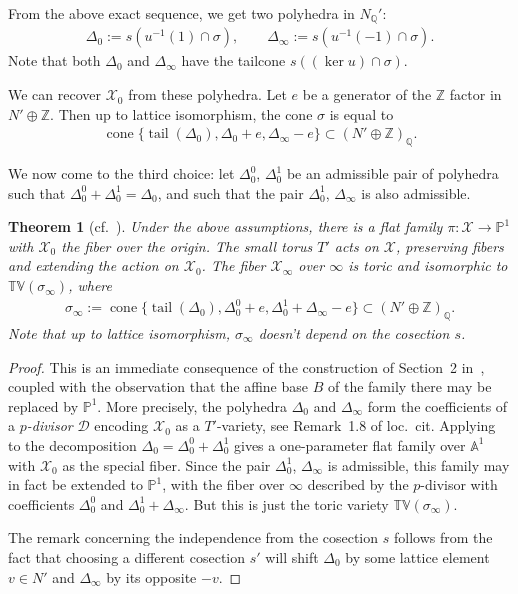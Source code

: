\documentclass[pdftex]{sigma}
\newcommand{\QQ}{\mathbb{Q}}
\newcommand{\ZZ}{\mathbb Z}
\newcommand{\PP}{\mathbb{P}}
\newcommand{\tv}{\mathbb{TV}}
\newcommand{\D}{\mathcal D}
\newcommand{\cX}{\mathcal{X}}
\DeclareMathOperator{\cone}{cone}
\DeclareMathOperator{\tail}{tail}
\newtheorem{Theorem}{Theorem}[section]
 { \theoremstyle{definition}
\newtheorem{Definition}[Theorem]{Definition}
\newtheorem{Example}[Theorem]{Example}
\newtheorem{Remark}[Theorem]{Remark} }
\begin{document}
From the above exact sequence, we get two polyhedra in $N_\QQ'$:
\begin{gather*}
\Delta_0 :=s(u^{-1}(1)\cap\sigma),\qquad
\Delta_\infty :=s(u^{-1}(-1)\cap\sigma).
\end{gather*}
Note that both $\Delta_0$ and $\Delta_\infty$ have the tailcone $s( (\ker u) \cap \sigma)$.

We can recover $\cX_0$ from these polyhedra. Let $e$ be a generator of the $\ZZ$ factor in $N' \oplus \ZZ$. Then up to lattice isomorphism, the cone $\sigma$ is equal to
\begin{gather*}
\cone \{\tail(\Delta_0),\Delta_0+e,\Delta_\infty-e\}\subset(N'\oplus \ZZ)_\QQ.
\end{gather*}

We now come to the third choice: let $\Delta_0^0$, $\Delta_0^1$ be an admissible pair of polyhedra such that $\Delta_0^0+\Delta_0^1=\Delta_0$, and such that the pair $\Delta_0^1$, $\Delta_\infty$ is also admissible.

\begin{Theorem}[{cf.~\cite[Theorem~2.8]{ilten:09b}}]\label{thm:family}
Under the above assumptions, there is a flat family \mbox{$\pi\colon \cX \to\PP^1$} with $\cX_0$ the fiber over the origin. The small torus $T'$ acts on $\cX$, preserving fibers and extending the action on $\cX_0$. The fiber $\cX_\infty$ over $\infty$ is toric and isomorphic to $\tv(\sigma_\infty)$, where
\begin{gather*}
\sigma_\infty:=\cone \big\{\tail(\Delta_0),\Delta_0^0+e,\Delta_0^1+\Delta_\infty-e\big\}\subset(N'\oplus \ZZ)_\QQ.
\end{gather*}
Note that up to lattice isomorphism, $\sigma_\infty$ doesn't depend on the cosection $s$.
\end{Theorem}

\begin{proof}
	This is an immediate consequence of the construction of Section~2 in~\cite{ilten:09b}, coupled with the observation that the af\/f\/ine base $B$ of the family there may be replaced by $\PP^1$.
	More precisely, the polyhedra $\Delta_0$ and $\Delta_\infty$ form the coef\/f\/icients of a \emph{$p$-divisor} $\D$ encoding $\cX_0$ as a $T'$-variety, see Remark~1.8 of loc.~cit.  Applying \cite[Theorem~2.8]{ilten:09b} to the decomposition $\Delta_0=\Delta_0^0+\Delta_0^1$ gives a one-parameter f\/lat family over $\mathbb{A}^1$ with $\cX_0$ as the special f\/iber. Since the pair $\Delta_0^1$, $\Delta_\infty$ is admissible, this family may in fact be extended to $\PP^1$, with the f\/iber over $\infty$ described by the $p$-divisor with coef\/f\/icients $\Delta_0^0$ and $\Delta_0^1+\Delta_\infty$. But this is just the toric variety $\tv(\sigma_\infty)$.

	The remark concerning the independence from the cosection $s$ follows from the fact that choosing a dif\/ferent cosection $s'$ will shift $\Delta_0$ by some lattice element $v\in N'$ and $\Delta_\infty$ by its opposite $-v$.
\end{proof}
\end{document}
